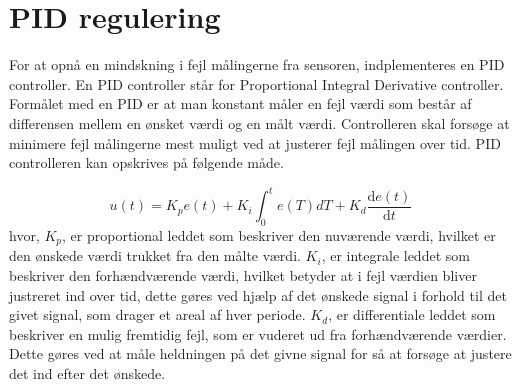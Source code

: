 \section{PID regulering}
For at opnå en mindskning i fejl målingerne fra sensoren, indplementeres en PID controller. En PID controller står for Proportional Integral Derivative controller. Formålet med en PID er at man konstant måler en fejl værdi som består af differensen mellem en ønsket værdi og en målt værdi. Controlleren skal forsøge at minimere fejl målingerne mest muligt ved at justerer fejl målingen over tid.\newline
{}
\newline
PID controlleren kan opskrives på følgende måde.

\begin{equation} 
u(t) = K_p e(t) + K_i\int_{0}^{t}e(T)dT + K_d\frac{\mathrm{d} e(t)}{\mathrm{d} t}
\end{equation}\label{PID}
\newline
hvor,
\newline
$K_{p}$, er proportional leddet som beskriver den nuværende værdi, hvilket er den ønskede værdi trukket fra den målte værdi. 
\newline
$K_{i}$, er integrale leddet som beskriver den forhændværende værdi, hvilket betyder at i fejl værdien bliver justreret ind over tid, dette gøres ved hjælp af det ønskede signal i forhold til det givet signal, som drager et areal af hver periode.   
\newline
$K_{d}$, er differentiale leddet som beskriver en mulig fremtidig fejl, som er vuderet ud fra forhændværende værdier. Dette gøres ved at måle heldningen på det givne signal for så at forsøge at justere det ind efter det ønskede. 
\newline

   